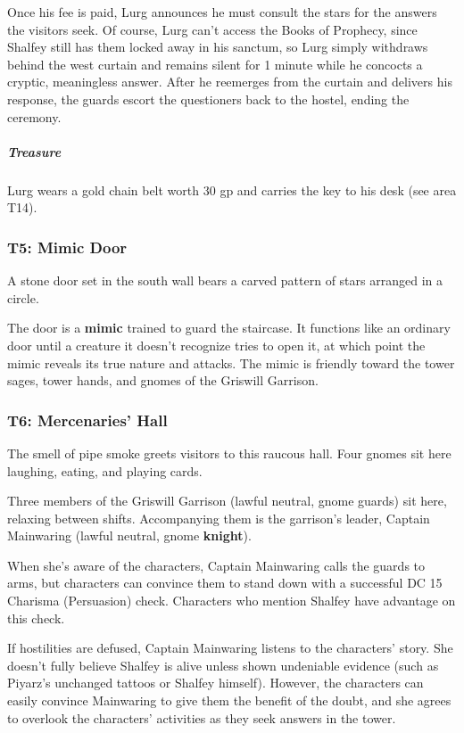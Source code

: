 \documentclass[10pt,a4paper,twoside,bg=print,twocolumn,openany,nodeprecatedcode]{dndbook}
\begin{document}
Once his fee is paid, Lurg announces he must consult the stars for the answers the visitors seek. Of course, Lurg can't access the Books of Prophecy, since Shalfey still has them locked away in his sanctum, so Lurg simply withdraws behind the west curtain and remains silent for 1 minute while he concocts a cryptic, meaningless answer. After he reemerges from the curtain and delivers his response, the guards escort the questioners back to the hostel, ending the ceremony.

\subparagraph{Treasure}
Lurg wears a gold chain belt worth 30 gp and carries the key to his desk (see area T14).

\subsubsection{T5: Mimic Door}
\begin{DndReadAloud}{}
A stone door set in the south wall bears a carved pattern of stars arranged in a circle.

\end{DndReadAloud}

The door is a \textbf{mimic} trained to guard the staircase. It functions like an ordinary door until a creature it doesn't recognize tries to open it, at which point the mimic reveals its true nature and attacks. The mimic is friendly toward the tower sages, tower hands, and gnomes of the Griswill Garrison.

\subsubsection{T6: Mercenaries' Hall}
\begin{DndReadAloud}{}
The smell of pipe smoke greets visitors to this raucous hall. Four gnomes sit here laughing, eating, and playing cards.

\end{DndReadAloud}

Three members of the Griswill Garrison (lawful neutral, gnome guards) sit here, relaxing between shifts. Accompanying them is the garrison's leader, Captain Mainwaring (lawful neutral, gnome \textbf{knight}).

When she's aware of the characters, Captain Mainwaring calls the guards to arms, but characters can convince them to stand down with a successful DC 15 Charisma (Persuasion) check. Characters who mention Shalfey have advantage on this check.

If hostilities are defused, Captain Mainwaring listens to the characters' story. She doesn't fully believe Shalfey is alive unless shown undeniable evidence (such as Piyarz's unchanged tattoos or Shalfey himself). However, the characters can easily convince Mainwaring to give them the benefit of the doubt, and she agrees to overlook the characters' activities as they seek answers in the tower.
\end{document}
